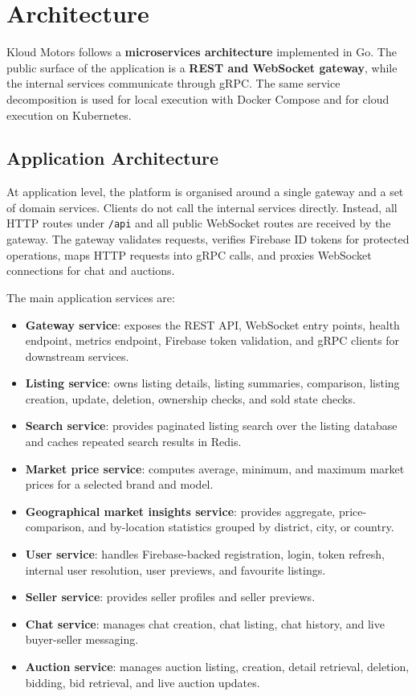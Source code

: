 \chapter{Architecture} \label{cap:architecture}

Kloud Motors follows a \textbf{microservices architecture} implemented in Go. The public surface of the application is a \textbf{REST and WebSocket gateway}, while the internal services communicate through gRPC. The same service decomposition is used for local execution with Docker Compose and for cloud execution on Kubernetes.

\section{Application Architecture}

At application level, the platform is organised around a single gateway and a set of domain services. Clients do not call the internal services directly. Instead, all HTTP routes under \texttt{/api} and all public WebSocket routes are received by the gateway. The gateway validates requests, verifies Firebase ID tokens for protected operations, maps HTTP requests into gRPC calls, and proxies WebSocket connections for chat and auctions.

The main application services are:

\begin{itemize}
    \item \textbf{Gateway service}: exposes the REST API, WebSocket entry points, health endpoint, metrics endpoint, Firebase token validation, and gRPC clients for downstream services.
    \item \textbf{Listing service}: owns listing details, listing summaries, comparison, listing creation, update, deletion, ownership checks, and sold state checks.
    \item \textbf{Search service}: provides paginated listing search over the listing database and caches repeated search results in Redis.
    \item \textbf{Market price service}: computes average, minimum, and maximum market prices for a selected brand and model.
    \item \textbf{Geographical market insights service}: provides aggregate, price-comparison, and by-location statistics grouped by district, city, or country.
    \item \textbf{User service}: handles Firebase-backed registration, login, token refresh, internal user resolution, user previews, and favourite listings.
    \item \textbf{Seller service}: provides seller profiles and seller previews.
    \item \textbf{Chat service}: manages chat creation, chat listing, chat history, and live buyer-seller messaging.
    \item \textbf{Auction service}: manages auction listing, creation, detail retrieval, deletion, bidding, bid retrieval, and live auction updates.
\end{itemize}

